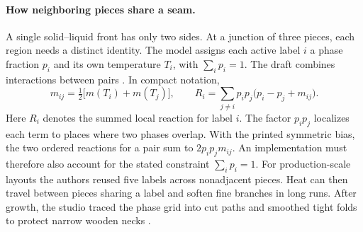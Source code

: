 \paragraph{How neighboring pieces share a seam.}
A single solid--liquid front has only two sides. At a junction of three
pieces, each region needs a distinct identity. The model assigns each
active label \(i\) a phase fraction \(p_i\) and its own temperature \(T_i\),
with \(\sum_i p_i=1\). The draft combines interactions between pairs
\cite[Eqs.~8--10]{puzzle2012}. In compact notation,
\begin{equation}
  m_{ij}=\tfrac12\bigl[m(T_i)+m(T_j)\bigr],
  \qquad
  R_i=\sum_{j\ne i}p_i p_j\bigl(p_i-p_j+m_{ij}\bigr).
\label{eq:dendrite-pairwise}
\end{equation}
Here \(R_i\) denotes the summed local reaction for label \(i\). The factor
\(p_i p_j\) localizes each term to places where two phases overlap. With the
printed symmetric bias, the two ordered reactions for a pair sum to
$2p_i p_j m_{ij}$. An implementation must therefore also account for the
stated constraint $\sum_i p_i=1$. For
production-scale layouts the authors reused five labels across nonadjacent
pieces. Heat can then travel between pieces sharing a label and soften fine
branches in long runs. After growth, the studio traced the phase grid into
cut paths and smoothed tight folds to protect narrow wooden necks
\cite{puzzle2012,puzzleproject}.

